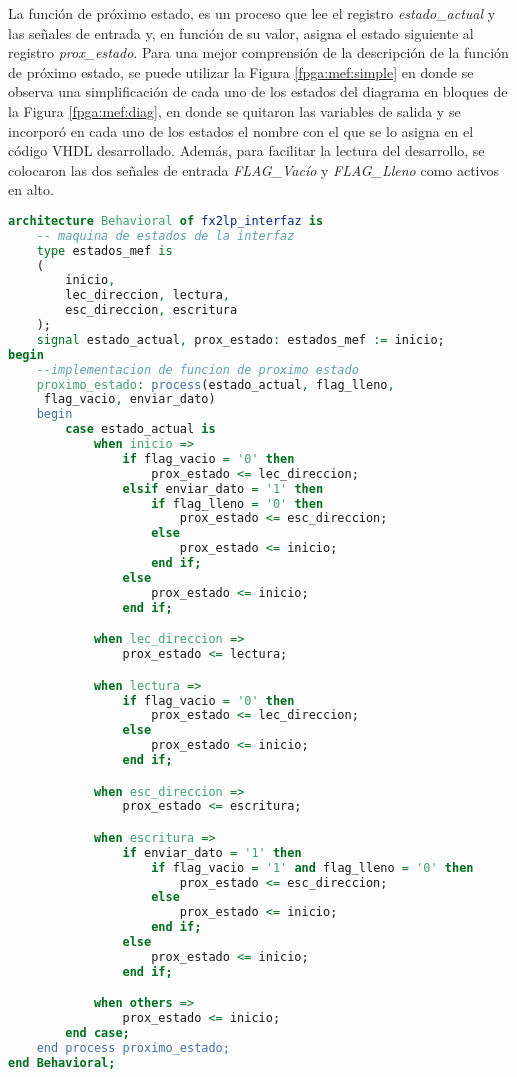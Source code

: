 La función de próximo estado, es un proceso que lee el registro \textit{estado\_actual} y las señales de entrada y, en función de su valor, asigna el estado siguiente al registro \textit{prox\_estado}. Para una mejor comprensión de la descripción de la función de próximo estado, se puede utilizar la Figura \ref{fpga:mef:simple} en donde se observa una simplificación de cada uno de los estados del diagrama en bloques de la Figura \ref{fpga:mef:diag}, en donde se quitaron las variables de salida y se incorporó en cada uno de los estados el nombre con el que se lo asigna en el código VHDL desarrollado. Además, para facilitar la lectura del desarrollo, se colocaron las dos señales de entrada \textit{FLAG\_Vacío} y \textit{FLAG\_Lleno} como activos en alto.

\begin{lstlisting}[language=VHDL,backgroundcolor=\color{gray!30}]
architecture Behavioral of fx2lp_interfaz is
	-- maquina de estados de la interfaz
	type estados_mef is
	(
		inicio,
		lec_direccion, lectura,
		esc_direccion, escritura
	);
	signal estado_actual, prox_estado: estados_mef := inicio;
begin
	--implementacion de funcion de proximo estado
	proximo_estado: process(estado_actual, flag_lleno,
	 flag_vacio, enviar_dato)
	begin
		case estado_actual is
			when inicio =>
				if flag_vacio = '0' then
					prox_estado <= lec_direccion;
				elsif enviar_dato = '1' then
					if flag_lleno = '0' then
						prox_estado <= esc_direccion;
					else
						prox_estado <= inicio;
					end if;
				else
					prox_estado <= inicio;
				end if;

			when lec_direccion =>
				prox_estado <= lectura;

			when lectura =>
				if flag_vacio = '0' then
					prox_estado <= lec_direccion;
				else
					prox_estado <= inicio;
				end if;

			when esc_direccion =>
				prox_estado <= escritura;

			when escritura =>
				if enviar_dato = '1' then
					if flag_vacio = '1' and flag_lleno = '0' then
						prox_estado <= esc_direccion;
					else
						prox_estado <= inicio;
					end if;
				else
					prox_estado <= inicio;
				end if;

			when others =>
				prox_estado <= inicio;
		end case;
	end process proximo_estado;
end Behavioral;
\end{lstlisting}

